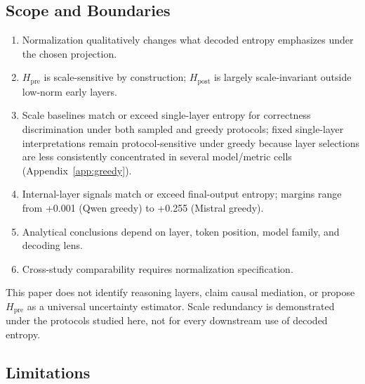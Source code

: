 \documentclass{ieeeaccess}
\newcommand{\Hpre}{H_{\text{pre}}}
\newcommand{\Hpost}{H_{\text{post}}}
\begin{document}
\subsection{Scope and Boundaries}

\begin{enumerate}
\item Normalization qualitatively changes what decoded entropy emphasizes under the chosen projection.
\item $\Hpre$ is scale-sensitive by construction; $\Hpost$ is largely scale-invariant outside low-norm early layers.
\item Scale baselines match or exceed single-layer entropy for correctness discrimination under both sampled and greedy protocols; fixed single-layer interpretations remain protocol-sensitive under greedy because layer selections are less consistently concentrated in several model/metric cells (Appendix~\ref{app:greedy}).
\item Internal-layer signals match or exceed final-output entropy; margins range from +0.001 (Qwen greedy) to +0.255 (Mistral greedy).
\item Analytical conclusions depend on layer, token position, model family, and decoding lens.
\item Cross-study comparability requires normalization specification.
\end{enumerate}

\noindent This paper does not identify reasoning layers, claim causal mediation, or propose $\Hpre$ as a universal uncertainty estimator. Scale redundancy is demonstrated under the protocols studied here, not for every downstream use of decoded entropy.

\subsection{Limitations}
\end{document}
